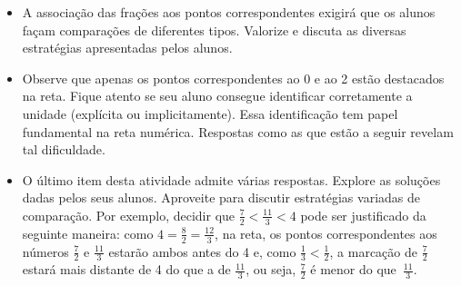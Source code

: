 \begin{orientacoes}{}{}
\begin{itemize}
    \item       A associação das frações aos pontos correspondentes exigirá que os alunos façam comparações de diferentes tipos. Valorize e discuta as diversas estratégias apresentadas pelos alunos.
    \item Observe que apenas os pontos correspondentes ao 0 e ao 2 estão destacados na reta. Fique atento se seu aluno consegue identificar corretamente a unidade (explícita ou implicitamente). Essa identificação tem papel fundamental na reta numérica. Respostas como as que estão a seguir revelam tal dificuldade.
      \begin{center}
      \end{center}
    \item       O último item desta atividade admite várias respostas. Explore as soluções dadas pelos seus alunos. Aproveite para discutir estratégias variadas de comparação. Por exemplo, decidir que $\frac{7}{2} < \frac{11}{3} < 4$ pode ser justificado da seguinte maneira: como $4 = \frac{8}{2} = \frac{12}{3}$, na reta, os pontos correspondentes aos números $\frac{7}{2}$ e $\frac{11}{3}$ estarão ambos antes do 4 e, como  $\frac{1}{3} < \frac{1}{2}$, a marcação de $\frac{7}{2}$ estará mais distante de 4 do que a de $\frac{11}{3}$, ou seja, $\frac{7}{2}$ é menor do que~$\frac{11}{3}$.
    \end{itemize} %
\end{orientacoes}


